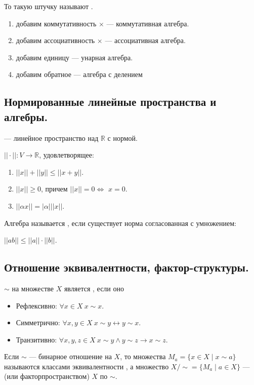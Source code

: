 То такую штучку называют .

\begin{enumerate}
    \item добавим коммутативность $\times$ --- коммутативная алгебра.

    \item добавим ассоциативность $\times$ --- ассоциативная алгебра.

    \item добавим единицу --- унарная алгебра.

    \item добавим обратное --- алгебра с делением
\end{enumerate}

\subsection{Нормированные линейные пространства и алгебры.}

 --- линейное пространство над $\mathbb{R}$ с нормой.

 $||\cdot||:V \rightarrow \mathbb{R}$, удовлетворящее:

\begin{enumerate}
    \item $||x|| + ||y||\leq ||x+y||$.
    \item $||x||\geq 0$, причем $||x||=0 \Leftrightarrow$ $x = 0$.
    \item  $||\alpha x|| = |\alpha|||x||$.
\end{enumerate}

Алгебра называется , если существует норма согласованная с умножением:

$||ab||\leq ||a|| \cdot ||b||$.

\subsection{Отношение эквивалентности, фактор-структуры.}

         
        
         $\sim$ на множестве $X$ является , если оно
        \begin{itemize}
            \item Рефлексивно: $\forall x\in X~x\sim x$.
            \item Симметрично: $\forall x,y\in X~x\sim y\leftrightarrow y\sim x$.
            \item Транзитивно: $\forall x,y,z\in X~x\sim y\land y\sim z\rightarrow x\sim z$.
        \end{itemize}
         Если $\sim$ --- бинарное отношение на $X$, то множества $M_a=\{x\in X\mid x\sim a\}$ называются классами эквивалентности , а множество $X/\sim=\{M_a\mid a\in X\}$ ---  (или {факторпространством}) $X$ по $\sim$.
         
